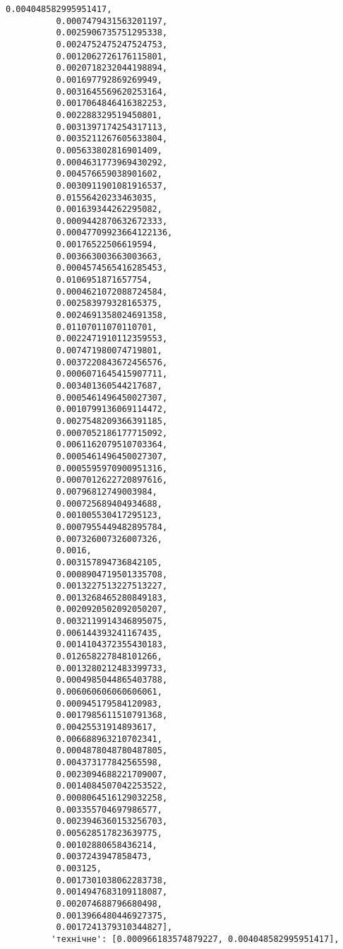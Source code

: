\documentclass[11pt]{article}
\begin{document}
\begin{Verbatim}[commandchars=\\\{\}]
          0.004048582995951417,
          0.0007479431563201197,
          0.0025906735751295338,
          0.0024752475247524753,
          0.0012062726176115801,
          0.0020718232044198894,
          0.001697792869269949,
          0.0031645569620253164,
          0.0017064846416382253,
          0.002288329519450801,
          0.0031397174254317113,
          0.0035211267605633804,
          0.005633802816901409,
          0.0004631773969430292,
          0.004576659038901602,
          0.0030911901081916537,
          0.01556420233463035,
          0.001639344262295082,
          0.0009442870632672333,
          0.00047709923664122136,
          0.00176522506619594,
          0.003663003663003663,
          0.0004574565416285453,
          0.0106951871657754,
          0.0004621072088724584,
          0.002583979328165375,
          0.0024691358024691358,
          0.01107011070110701,
          0.0022471910112359553,
          0.007471980074719801,
          0.0037220843672456576,
          0.0006071645415907711,
          0.003401360544217687,
          0.0005461496450027307,
          0.0010799136069114472,
          0.0027548209366391185,
          0.0007052186177715092,
          0.0061162079510703364,
          0.0005461496450027307,
          0.0005595970900951316,
          0.0007012622720897616,
          0.00796812749003984,
          0.000725689404934688,
          0.001005530417295123,
          0.0007955449482895784,
          0.007326007326007326,
          0.0016,
          0.003157894736842105,
          0.0008904719501335708,
          0.0013227513227513227,
          0.0013268465280849183,
          0.0020920502092050207,
          0.0032119914346895075,
          0.006144393241167435,
          0.0014104372355430183,
          0.012658227848101266,
          0.0013280212483399733,
          0.0004985044865403788,
          0.006060606060606061,
          0.000945179584120983,
          0.0017985611510791368,
          0.00425531914893617,
          0.006688963210702341,
          0.0004878048780487805,
          0.004373177842565598,
          0.0023094688221709007,
          0.0014084507042253522,
          0.0008064516129032258,
          0.003355704697986577,
          0.0023946360153256703,
          0.005628517823639775,
          0.00102880658436214,
          0.0037243947858473,
          0.003125,
          0.0017301038062283738,
          0.0014947683109118087,
          0.002074688796680498,
          0.0013966480446927375,
          0.0017241379310344827],
         'технічне': [0.000966183574879227, 0.004048582995951417],

\end{Verbatim}
\end{document}
